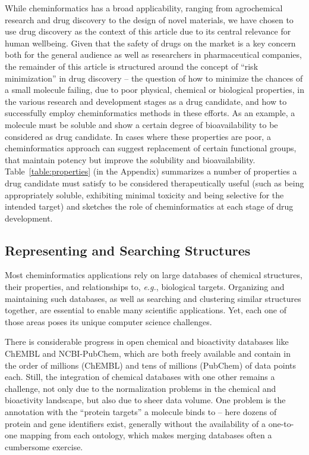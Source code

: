 \documentclass{sig-alternate}
\begin{document}
While cheminformatics has a broad applicability, ranging from
agrochemical research and drug discovery to the design of novel
materials, we have chosen to use drug discovery as the context of this
article due to its central relevance for human wellbeing. Given that
the safety of drugs on the market is a key concern both for the
general audience as well as researchers in pharmaceutical companies,
the remainder of this article is structured around the concept of
``risk minimization'' in drug discovery -- the question of how to
minimize the chances of a small molecule failing, due to poor
physical, chemical or biological properties, in the various research
and development stages as a drug candidate, and how to successfully
employ cheminformatics methods in these efforts. As an example, a
molecule must be soluble and show a certain degree of bioavailability
to be considered as drug candidate. In cases where these properties
are poor, a cheminformatics approach can suggest replacement of
certain functional groups, that maintain potency but improve the
solubility and bioavailability.  Table~\ref{table:properties} (in the
Appendix) summarizes a number of properties a drug candidate must
satisfy to be considered therapeutically useful (such as being
appropriately soluble, exhibiting minimal toxicity and being selective
for the intended target) and sketches the role of cheminformatics at
each stage of drug development.
%
\subsection{Representing and Searching Structures}
\label{sec:databases}
%
Most cheminformatics applications rely on large databases of chemical
structures, their properties, and relationships to, \textit{e.g.},
biological targets.  Organizing and maintaining such databases, as
well as searching and clustering similar structures together, are
essential to enable many scientific applications. Yet, each one of
those areas poses its unique computer science challenges.

There is considerable progress in open chemical and bioactivity
databases like ChEMBL and NCBI-PubChem, which are both freely
available and contain in the order of millions (ChEMBL) and tens of
millions (PubChem) of data points each. Still, the integration of
chemical databases with one other remains a challenge, not only due
to the normalization problems in the chemical and bioactivity
landscape, but also due to sheer data volume. One problem is the
annotation with the ``protein targets'' a molecule binds to -- here
dozens of protein and gene identifiers exist, generally without the
availability of a one-to-one mapping from each ontology, which makes
merging databases often a cumbersome exercise.
\end{document}
